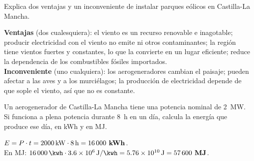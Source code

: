 \begin{exercise}
    Explica dos ventajas y un inconveniente de instalar parques eólicos en Castilla-La Mancha.
    \begin{solu}
        \textbf{Ventajas} (dos cualesquiera): el viento es un recurso renovable e inagotable; producir electricidad con el viento no emite  ni otros contaminantes; la región tiene vientos fuertes y constantes, lo que la convierte en un lugar eficiente; reduce la dependencia de los combustibles fósiles importados. \\
        \textbf{Inconveniente} (uno cualquiera): los aerogeneradores cambian el paisaje; pueden afectar a las aves y a los murciélagos; la producción de electricidad depende de que sople el viento, así que no es constante.
    \end{solu}
\end{exercise}

\begin{exercise}
    Un aerogenerador de Castilla-La Mancha tiene una potencia nominal de \qty{2}{\mega\watt}. Si funciona a plena potencia durante \qty{8}{\hour} en un día, calcula la energía que produce ese día, en kWh y en MJ.
    \begin{solu}
        \(E = P \cdot t = \qty{2000}{\kilo\watt} \cdot \qty{8}{\hour} = \textbf{\num{16000} kWh}\). \\
        En MJ: \(\qty{16000}{\kwh} \cdot \qty{3.6e6}{\joule\per\kwh} = \qty{5.76e10}{\joule} = \textbf{\num{57600} MJ}\).
    \end{solu}
\end{exercise}

